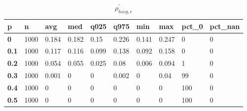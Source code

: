 \begin{table}[h]
 \centering 
\footnotesize
\caption{$\rho_{hscg,c}^\prime $}
\label{tab:alphahscgc}
\begin{tabular}[h]{|l|l|l|l|l|l|l|l|l|l|
    } \hline
\textbf{ p} & \textbf{ n} & \textbf{ avg} & \textbf{ med} & \textbf{ q025} & \textbf{ q975} & \textbf{ min} & \textbf{ max} & \textbf{ pct\_0} & \textbf{ pct\_nan}
    \\ \hline
  \textbf{  0} & 1000 & 0.184 & 0.182 &  0.15 & 0.226 & 0.141 & 0.247 &   0 & 0
    \\ \hline
  \textbf{0.1} & 1000 & 0.117 & 0.116 & 0.099 & 0.138 & 0.092 & 0.158 &   0 & 0
    \\ \hline
  \textbf{0.2} & 1000 & 0.054 & 0.055 & 0.025 &  0.08 & 0.006 & 0.094 &   1 & 0
    \\ \hline
  \textbf{0.3} & 1000 & 0.001 &     0 &     0 & 0.002 &     0 &  0.04 &  99 & 0
    \\ \hline
  \textbf{0.4} & 1000 &     0 &     0 &     0 &     0 &     0 &     0 & 100 & 0
    \\ \hline
  \textbf{0.5} & 1000 &     0 &     0 &     0 &     0 &     0 &     0 & 100 & 0
    \\ \hline
 \end{tabular}
 \end{table}
